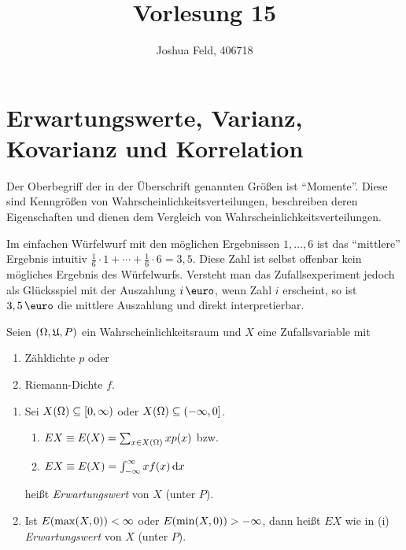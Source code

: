 \documentclass{lecture}
\institute{Institut für Statistik und Wirtschaftsmathematik}
\title{Vorlesung 15}
\author{Joshua Feld, 406718}
\begin{document}
    \maketitle


    \section*{Erwartungswerte, Varianz, Kovarianz und Korrelation}
    
    Der Oberbegriff der in der Überschrift genannten Größen ist ``Momente''.
    Diese sind Kenngrößen von Wahrscheinlichkeitsverteilungen, beschreiben deren Eigenschaften und dienen dem Vergleich von Wahrscheinlichkeitsverteilungen.
    
    Im einfachen Würfelwurf mit den möglichen Ergebnissen \(1, \ldots, 6\) ist das ``mittlere'' Ergebnis intuitiv \(\frac{1}{6} \cdot 1 + \cdots + \frac{1}{6} \cdot 6 = 3,5\).
    Diese Zahl ist selbst offenbar kein mögliches Ergebnis des Würfelwurfs.
    Versteht man das Zufallsexperiment jedoch als Glücksspiel mit der Auszahlung \(i\,\text{\euro}\), wenn Zahl \(i\) erscheint, so ist \(3,5\,\text{\euro}\) die mittlere Auszahlung und direkt interpretierbar.
    
    \begin{definition}
        Seien \(\parentheses*{\Omega, \mathfrak{U}, P}\) ein Wahrscheinlichkeitsraum und \(X\) eine Zufallsvariable mit
        \begin{enumerate}[label=\alph*)]
            \item Zähldichte \(p\) oder
            \item Riemann-Dichte \(f\).
        \end{enumerate}
        \begin{enumerate}
            \item Sei \(X\parentheses*{\Omega} \subseteq \left[0, \infty\right)\) oder \(X\parentheses*{\Omega} \subseteq \left(-\infty, 0\right]\).
            \begin{enumerate}[label=\alph*)]
                \item \(EX \equiv E\parentheses*{X} = \sum_{x \in X\parentheses*{\Omega}}xp\parentheses*{x}\) bzw.
                \item \(EX \equiv E\parentheses*{X} = \int_{-\infty}^\infty xf\parentheses*{x}\d x\)
            \end{enumerate}
            heißt \emph{Erwartungswert} von \(X\) (unter \(P\)).
            \item Ist \(E\parentheses*{\max\parentheses*{X, 0}} < \infty\) oder \(E\parentheses*{\min\parentheses*{X, 0}} > -\infty\), dann heißt \(EX\) wie in (i) \emph{Erwartungswert} von \(X\) (unter \(P\)).
        \end{enumerate}
    \end{definition}
    
\end{document}
